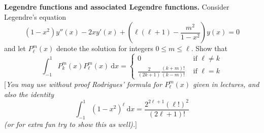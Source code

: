 \documentclass[answers]{exam}
\begin{document}
\begin{questions}
\question%
\textbf{Legendre functions and associated Legendre functions.} Consider Legendre's equation \[
	(1-x^{2}) y''(x)-2 x y'(x)+\left(\ell(\ell+1)-\frac{m^{2}}{1-x^{2}}\right) y(x)=0
\] and let $P_{\ell}^{m}(x)$ denote the solution for integers $0 \leq m \leq \ell$. Show that \[
	\int_{-1}^{1} P_{k}^{m}(x) P_{\ell}^{m}(x) ~\mathrm{d} x= \begin{cases}
		0 & \text { if } \ell \neq k \\[1em]
		\displaystyle\frac{2}{(2 k+1)} \frac{(k+m)!}{(k-m)!} & \text { if } \ell=k
	\end{cases}
\] [\emph{You may use without proof Rodrigues' formula for $P_{\ell}^{m}(x)$ given in lectures, and also the identity \[
	\int_{-1}^{1}\left(1-x^{2}\right)^{\ell} ~\mathrm{d} x=\frac{2^{2 \ell+1}(\ell!)^{2}}{(2 \ell+1)!}
\] (or for extra fun try to show this as well).}]

\end{questions}
\end{document}
